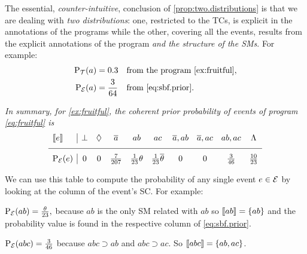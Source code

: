 \documentclass[x11names]{tlp}
\begin{document}
The essential, \emph{counter-intuitive}, conclusion of
\cref{prop:two.distributions} is that we are dealing with \emph{two
	distributions}: one, restricted to the \aclp{TC}, is explicit in the
annotations of the programs while the other, covering all the events, results
from the explicit annotations of the program \emph{and the structure of the
	\aclp{SM}}. For example:
\begin{equation*}
	\begin{aligned}
		\prT\at{a} & = 0.3          &  &
		\text{from the program \cref{ex:fruitful}}, %
		\\
		\prE\at{a} & = \frac{3}{64} &  &
		\text{from \cref{eq:sbf.prior}}.
	\end{aligned}
\end{equation*}
\begin{example}
	\label{ex:prob.events}
	\em
	In summary, for \cref{ex:fruitful}, the coherent \emph{prior} probability of
	events of program \cref{eq:fruitful} is
	\begin{equation}
		\begin{array}{l|ccccccccc}
			\stablecore{e}          &
			\inconsistent           &
			\indepclass             &
			\co{a}                  &
			ab                      &
			ac                      &
			\co{a}, ab              &
			\co{a}, ac              &
			ab, ac                  &
			\consequenceclass
			\\ \hline
			\prE\at{e}              &
			0                       &
			0                       &
			\frac{7}{207}           &
			\frac{1}{23}\theta      &
			\frac{1}{23}\co{\theta} &
			0                       &
			0                       &
			\frac{3}{46}            &
			\frac{10}{23}
		\end{array}
		\label{eq:sbf.prior}
	\end{equation}

	We can use this table to compute the probability of any single event $e \in
		\EVENTSset$ by looking at the column of the event's \acl{SC}. For example:
	\begin{description}
		\item $\prE\at{ab} = \frac{\theta}{23}, $ because $ab$ is the only \ac{SM} related with $ab$ so $\left\llbracket ab \right\rrbracket = \set{ab}$ and the probability value is found in the respective column of \cref{eq:sbf.prior}.

		\item $\prE\at{abc} = \frac{3}{46}$ because $abc \supset  ab$ and $abc \supset ac$. So $\left\llbracket abc \right\rrbracket = \set{ab, ac}$.


\end{description}
\end{example}
\end{document}
